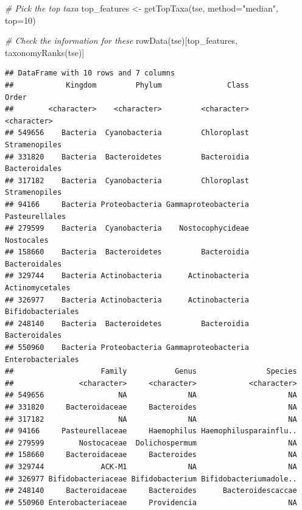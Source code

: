 \documentclass[
]{book}
\newenvironment{Shaded}{\begin{snugshade}}{\end{snugshade}}
\newcommand{\AttributeTok}[1]{\textcolor[rgb]{0.77,0.63,0.00}{#1}}
\newcommand{\CommentTok}[1]{\textcolor[rgb]{0.56,0.35,0.01}{\textit{#1}}}
\newcommand{\DecValTok}[1]{\textcolor[rgb]{0.00,0.00,0.81}{#1}}
\newcommand{\FunctionTok}[1]{\textcolor[rgb]{0.00,0.00,0.00}{#1}}
\newcommand{\NormalTok}[1]{#1}
\newcommand{\OtherTok}[1]{\textcolor[rgb]{0.56,0.35,0.01}{#1}}
\newcommand{\StringTok}[1]{\textcolor[rgb]{0.31,0.60,0.02}{#1}}
\begin{document}
\begin{Shaded}
\begin{Highlighting}[]
\CommentTok{\# Pick the top taxa}
\NormalTok{top\_features }\OtherTok{\textless{}{-}} \FunctionTok{getTopTaxa}\NormalTok{(tse, }\AttributeTok{method=}\StringTok{"median"}\NormalTok{, }\AttributeTok{top=}\DecValTok{10}\NormalTok{)}

\CommentTok{\# Check the information for these}
\FunctionTok{rowData}\NormalTok{(tse)[top\_features, }\FunctionTok{taxonomyRanks}\NormalTok{(tse)]}
\end{Highlighting}
\end{Shaded}

\begin{verbatim}
## DataFrame with 10 rows and 7 columns
##            Kingdom         Phylum               Class             Order
##        <character>    <character>         <character>       <character>
## 549656    Bacteria  Cyanobacteria         Chloroplast     Stramenopiles
## 331820    Bacteria  Bacteroidetes         Bacteroidia     Bacteroidales
## 317182    Bacteria  Cyanobacteria         Chloroplast     Stramenopiles
## 94166     Bacteria Proteobacteria Gammaproteobacteria    Pasteurellales
## 279599    Bacteria  Cyanobacteria    Nostocophycideae        Nostocales
## 158660    Bacteria  Bacteroidetes         Bacteroidia     Bacteroidales
## 329744    Bacteria Actinobacteria      Actinobacteria   Actinomycetales
## 326977    Bacteria Actinobacteria      Actinobacteria Bifidobacteriales
## 248140    Bacteria  Bacteroidetes         Bacteroidia     Bacteroidales
## 550960    Bacteria Proteobacteria Gammaproteobacteria Enterobacteriales
##                    Family           Genus                Species
##               <character>     <character>            <character>
## 549656                 NA              NA                     NA
## 331820     Bacteroidaceae     Bacteroides                     NA
## 317182                 NA              NA                     NA
## 94166     Pasteurellaceae     Haemophilus Haemophilusparainflu..
## 279599        Nostocaceae  Dolichospermum                     NA
## 158660     Bacteroidaceae     Bacteroides                     NA
## 329744             ACK-M1              NA                     NA
## 326977 Bifidobacteriaceae Bifidobacterium Bifidobacteriumadole..
## 248140     Bacteroidaceae     Bacteroides      Bacteroidescaccae
## 550960 Enterobacteriaceae     Providencia                     NA
\end{verbatim}
\end{document}
